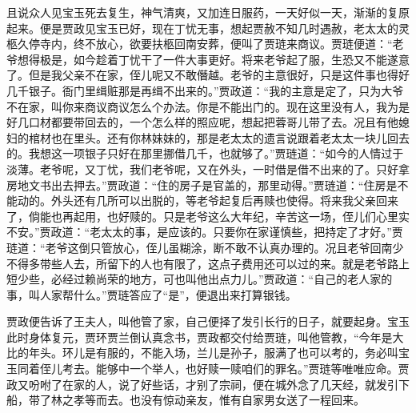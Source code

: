 \begin{parag}
    且说众人见宝玉死去复生，神气清爽，又加连日服药，一天好似一天，渐渐的复原起来。便是贾政见宝玉已好，现在丁忧无事，想起贾赦不知几时遇赦，老太太的灵柩久停寺内，终不放心，欲要扶柩回南安葬，便叫了贾琏来商议。贾琏便道：“老爷想得极是，如今趁着丁忧干了一件大事更好。将来老爷起了服，生恐又不能遂意了。但是我父亲不在家，侄儿呢又不敢僭越。老爷的主意很好，只是这件事也得好几千银子。衙门里缉赃那是再缉不出来的。”贾政道：“我的主意是定了，只为大爷不在家，叫你来商议商议怎么个办法。你是不能出门的。现在这里没有人，我为是好几口材都要带回去的，一个怎么样的照应呢，想起把蓉哥儿带了去。况且有他媳妇的棺材也在里头。还有你林妹妹的，那是老太太的遗言说跟着老太太一块儿回去的。我想这一项银子只好在那里挪借几千，也就够了。”贾琏道：“如今的人情过于淡薄。老爷呢，又丁忧，我们老爷呢，又在外头，一时借是借不出来的了。只好拿房地文书出去押去。”贾政道：“住的房子是官盖的，那里动得。”贾琏道：“住房是不能动的。外头还有几所可以出脱的，等老爷起复后再赎也使得。将来我父亲回来了，倘能也再起用，也好赎的。只是老爷这么大年纪，辛苦这一场，侄儿们心里实不安。”贾政道：“老太太的事，是应该的。只要你在家谨慎些，把持定了才好。”贾琏道：“老爷这倒只管放心，侄儿虽糊涂，断不敢不认真办理的。况且老爷回南少不得多带些人去，所留下的人也有限了，这点子费用还可以过的来。就是老爷路上短少些，必经过赖尚荣的地方，可也叫他出点力儿。”贾政道：“自己的老人家的事，叫人家帮什么。”贾琏答应了“是”，便退出来打算银钱。
\end{parag}


\begin{parag}
    贾政便告诉了王夫人，叫他管了家，自己便择了发引长行的日子，就要起身。宝玉此时身体复元，贾环贾兰倒认真念书，贾政都交付给贾琏，叫他管教，“今年是大比的年头。环儿是有服的，不能入场，兰儿是孙子，服满了也可以考的，务必叫宝玉同着侄儿考去。能够中一个举人，也好赎一赎咱们的罪名。”贾琏等唯唯应命。贾政又吩咐了在家的人，说了好些话，才别了宗祠，便在城外念了几天经，就发引下船，带了林之孝等而去。也没有惊动亲友，惟有自家男女送了一程回来。
\end{parag}


